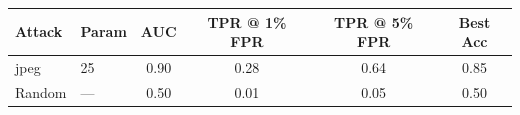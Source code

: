 \begin{tabular}{llcccc}
\toprule
Attack & Param & AUC & TPR @ 1\% FPR & TPR @ 5\% FPR & Best Acc \\
\midrule
jpeg & 25 & 0.90 & 0.28 & 0.64 & 0.85 \\
Random & — & 0.50 & 0.01 & 0.05 & 0.50 \\
\bottomrule
\end{tabular}
